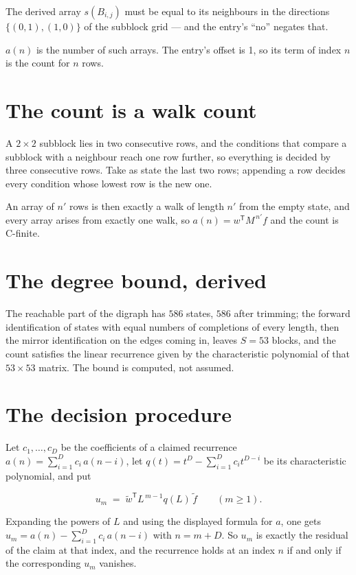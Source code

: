 \documentclass[11pt]{article}
\theoremstyle{definition}
\begin{document}
The derived array $s(B_{i,j})$ must be equal to its neighbours in the directions $\{(0,1), (1,0)\}$ of the subblock grid --- and the entry's ``no'' negates that.

$a(n)$ is the number of such arrays. The entry's offset is 1, so its term of index $n$ is the count for $n$ rows.

\section{The count is a walk count}

A $2\times2$ subblock lies in two consecutive rows, and the conditions that compare a subblock with a neighbour reach one row further, so everything is decided by three consecutive rows. Take as state the last two rows; appending a row decides every condition whose lowest row is the new one.

An array of $n'$ rows is then exactly a walk of length $n'$ from the empty state, and every array arises from exactly one walk, so $a(n) = w^{\mathsf T}M^{\,n'}f$ and the count is C-finite.

\section{The degree bound, derived}

The reachable part of the digraph has $586$ states, $586$ after trimming; the forward identification of states with equal numbers of completions of every length, then the mirror identification on the edges coming in, leaves $S = 53$ blocks, and the count satisfies the linear recurrence given by the characteristic polynomial of that $53\times53$ matrix. The bound is computed, not assumed.

\section{The decision procedure}

Let $c_1,\dots,c_D$ be the coefficients of a claimed recurrence $a(n) = \sum_{i=1}^{D} c_i\,a(n-i)$, let $q(t) = t^{D} - \sum_{i=1}^{D} c_i t^{D-i}$ be its characteristic polynomial, and put

\[u_m \;=\; \tilde w^{\mathsf T} L^{\,m-1} q(L)\,\tilde f \qquad (m \ge 1).\]

Expanding the powers of $L$ and using the displayed formula for $a$, one gets $u_m = a(n) - \sum_{i=1}^{D} c_i\,a(n-i)$ with $n = m + D$. So $u_m$ is exactly the residual of the claim at that index, and the recurrence holds at an index $n$ if and only if the corresponding $u_m$ vanishes.
\end{document}
